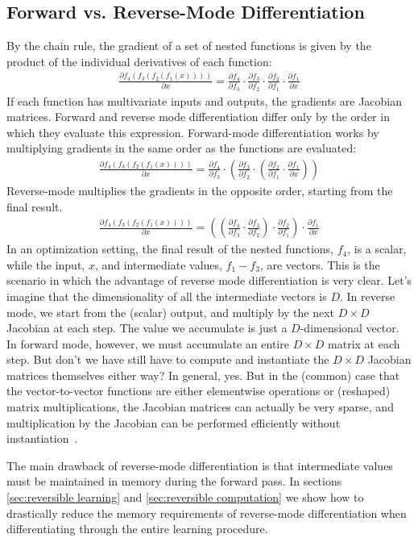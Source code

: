 \documentclass{article}
\newcommand{\pderiv}[2]{\frac{\partial #1}{\partial #2}}
\begin{document}
\subsection{Forward vs. Reverse-Mode Differentiation}
By the chain rule, the gradient of a set of nested functions is given by the product of the individual derivatives of each function:
%
\begin{align*}
\pderiv{f_4(f_3(f_2(f_1(x))))}{x} = \pderiv{f_4}{f_3} \cdot \pderiv{f_3}{f_2} \cdot \pderiv{f_2}{f_1} \cdot \pderiv{f_1}{x}
\end{align*}
If each function has multivariate inputs and outputs, the gradients are
Jacobian matrices. Forward and reverse mode differentiation differ
only by the order in which they evaluate this expression.
%
Forward-mode differentiation works by multiplying gradients in the same order as
the functions are evaluated:
%
\begin{align*}
\pderiv{f_4(f_3(f_2(f_1(x))))}{x} = \pderiv{f_4}{f_3} \cdot \left( \pderiv{f_3}{f_2} \cdot \left( \pderiv{f_2}{f_1} \cdot \pderiv{f_1}{x} \right) \right)
\end{align*}
%
Reverse-mode multiplies the gradients in the opposite order, starting from the
final result.
%
\begin{align*}
\pderiv{f_4(f_3(f_2(f_1(x))))}{x} = \left(  \left(  \pderiv{f_4}{f_3} \cdot \pderiv{f_3}{f_2} \right) \cdot \pderiv{f_2}{f_1} \right) \cdot \pderiv{f_1}{x} 
\end{align*}
%
In an optimization setting, the final result of the nested functions, $f_4$, is
a scalar, while the input, $x$, and intermediate values, $f_1 - f_3$, are
vectors. This is the scenario in which the advantage of reverse mode
differentiation is very clear. Let's imagine that the dimensionality of all the
intermediate vectors is $D$. In reverse mode, we start from the (scalar) output,
and multiply by the next $D \times D$ Jacobian at each step. The value we
accumulate is just a $D$-dimensional vector. In forward mode, however, we must
accumulate an entire $D \times D$ matrix at each step. But don't we have still
have to compute and instantiate the $D \times D$ Jacobian matrices themselves
either way?  In general, yes. But in the (common) case that the vector-to-vector
functions are either elementwise operations or (reshaped) matrix multiplications, the
Jacobian matrices can actually be very sparse, and multiplication by the
Jacobian can be performed efficiently without instantiation~\cite{pearlmutter2008reverse}.

The main drawback of reverse-mode differentiation is that intermediate values
must be maintained in memory during the forward pass. In sections
\ref{sec:reversible learning} and \ref{sec:reversible computation} we show how
to drastically reduce the memory requirements of reverse-mode differentiation
when differentiating through the entire learning procedure.
\end{document}
